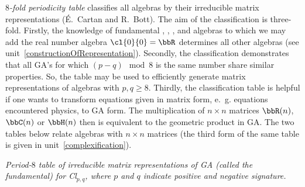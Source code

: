 \begin{unit}\textit{$8$-fold periodicity table}\label{8foldperiod}
classifies  all  algebras by their irreducible matrix
representations ({\'E}.~Cartan and R.~Bott). The aim of the
classification is three-fold. Firstly, the knowledge of
fundamental , , ,  and
 algebras to which we may add the real number algebra
$\cl{0}{0}=\bbR$ determines all other  algebras (see
unit~\ref{constructionOfRepresentation}). Secondly, the
classification demonstrates that all GA's for which $(p-q)\mod{8}$ is the same number share similar properties. So, the table may be used to efficiently generate
matrix representations of algebras with $p,q\ge 8$.
Thirdly, the classification table is helpful if one wants to
transform equations given in matrix form, e.~g. equations
encountered physics, to GA form. The multiplication of $n\times n$
matrices $\bbR(n)$, $\bbC(n)$ or $\bbH(n)$ then is equivalent to
the geometric product in GA. The two tables below relate 
algebras with $n\times n$ matrices (the third form of the same table is given in unit~\ref{complexification}).
%
\begin{center}\label{TableOfPeriodicity1}
\parbox[t]{0.9\textwidth}{
\textit{Period-$8$ table of irreducible
matrix representations of GA (called the fundamental) for
Cl$_{p,q}$, where $p$ and  $q$ indicate positive and negative signature.}}


\end{center}
\end{unit}
